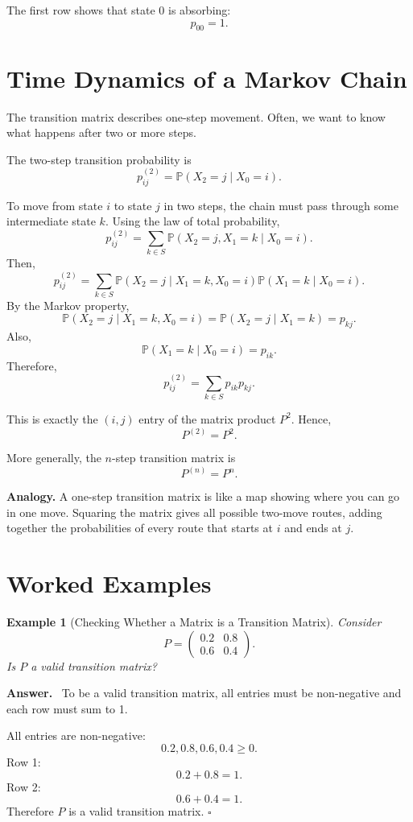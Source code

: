 \documentclass[12pt,a4paper]{article}
\theoremstyle{lecturestyle}
\newtheorem{example}{Example}
\newenvironment{answer}
{\par\textbf{Answer.}\ }
{\hfill$\square$\par}
\newcommand{\Prob}{\mathbb{P}}
\begin{document}
The first row shows that state 0 is absorbing:
\[
p_{00}=1.
\]

\section{Time Dynamics of a Markov Chain}

The transition matrix describes one-step movement. Often, we want to know what happens after two or more steps.

The two-step transition probability is
\[
p_{ij}^{(2)}=\Prob(X_2=j\mid X_0=i).
\]

To move from state $i$ to state $j$ in two steps, the chain must pass through some intermediate state $k$. Using the law of total probability,
\[
p_{ij}^{(2)}
=\sum_{k\in S}\Prob(X_2=j,X_1=k\mid X_0=i).
\]
Then,
\[
p_{ij}^{(2)}
=\sum_{k\in S}\Prob(X_2=j\mid X_1=k,X_0=i)\Prob(X_1=k\mid X_0=i).
\]
By the Markov property,
\[
\Prob(X_2=j\mid X_1=k,X_0=i)=\Prob(X_2=j\mid X_1=k)=p_{kj}.
\]
Also,
\[
\Prob(X_1=k\mid X_0=i)=p_{ik}.
\]
Therefore,
\[
p_{ij}^{(2)}=\sum_{k\in S}p_{ik}p_{kj}.
\]

This is exactly the $(i,j)$ entry of the matrix product $P^2$. Hence,
\[
P^{(2)}=P^2.
\]

More generally, the $n$-step transition matrix is
\[
P^{(n)}=P^n.
\]

\textbf{Analogy.} A one-step transition matrix is like a map showing where you can go in one move. Squaring the matrix gives all possible two-move routes, adding together the probabilities of every route that starts at $i$ and ends at $j$.

\section{Worked Examples}

\begin{example}[Checking Whether a Matrix is a Transition Matrix]
Consider
\[
P=
\begin{pmatrix}
0.2 & 0.8\\
0.6 & 0.4
\end{pmatrix}.
\]
Is $P$ a valid transition matrix?
\end{example}

\begin{answer}
To be a valid transition matrix, all entries must be non-negative and each row must sum to 1.

All entries are non-negative:
\[
0.2,0.8,0.6,0.4\geq 0.
\]
Row 1:
\[
0.2+0.8=1.
\]
Row 2:
\[
0.6+0.4=1.
\]
Therefore $P$ is a valid transition matrix.
\end{answer}
\end{document}
